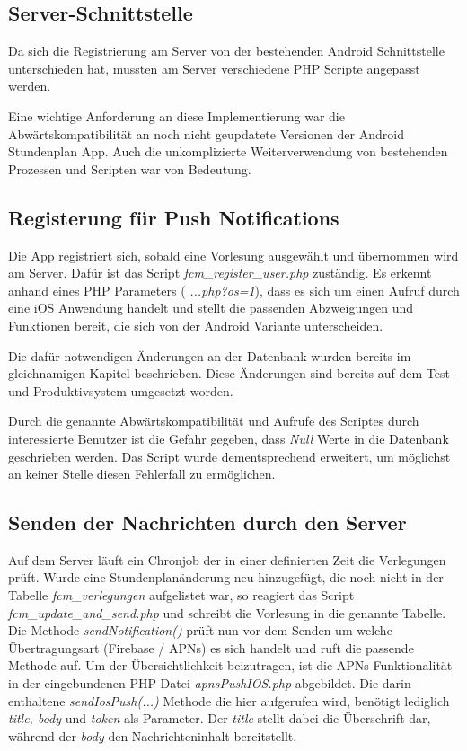 \subsection{Server-Schnittstelle}
Da sich die Registrierung am Server von der bestehenden Android Schnittstelle unterschieden hat, mussten am Server verschiedene PHP Scripte angepasst werden.

Eine wichtige Anforderung an diese Implementierung war die Abwärtskompatibilität an noch nicht geupdatete Versionen der Android Stundenplan App. Auch die unkomplizierte Weiterverwendung von bestehenden Prozessen und Scripten war von Bedeutung.

\newpage


\subsection{Registerung für Push Notifications}
Die App registriert sich, sobald eine Vorlesung ausgewählt und übernommen wird am Server. Dafür ist das Script \textit{fcm\_register\_user.php} zuständig. Es erkennt anhand eines PHP Parameters ( \textit{...php?os=1}), dass es sich um einen Aufruf durch eine iOS Anwendung handelt und stellt die passenden Abzweigungen und Funktionen bereit, die sich von der Android Variante unterscheiden.

Die dafür notwendigen Änderungen an der Datenbank wurden bereits im gleichnamigen Kapitel beschrieben. Diese Änderungen sind bereits auf dem Test- und Produktivsystem umgesetzt worden.

Durch die genannte Abwärtskompatibilität und Aufrufe des Scriptes durch interessierte Benutzer ist die Gefahr gegeben, dass \textit{Null} Werte in die Datenbank geschrieben werden. Das Script wurde dementsprechend erweitert, um möglichst an keiner Stelle diesen Fehlerfall zu ermöglichen.

\subsection{Senden der Nachrichten durch den Server}
Auf dem Server läuft ein Chronjob der in einer definierten Zeit die Verlegungen prüft. Wurde eine Stundenplanänderung neu hinzugefügt, die noch nicht in der Tabelle \textit{fcm\_verlegungen} aufgelistet war, so reagiert das Script \textit{fcm\_update\_and\_send.php} und schreibt die Vorlesung in die genannte Tabelle.\\
Die Methode \textit{sendNotification()} prüft nun vor dem Senden um welche Übertragungsart (Firebase / APNs) es sich handelt und ruft die passende Methode auf.
Um der Übersichtlichkeit beizutragen, ist die APNs Funktionalität in der eingebundenen PHP Datei \textit{apnsPushIOS.php} abgebildet. Die darin enthaltene \textit{sendIosPush(...)} Methode die hier aufgerufen wird, benötigt lediglich \textit{title, body} und \textit{token} als Parameter. Der \textit{title} stellt dabei die Überschrift dar, während der \textit{body} den Nachrichteninhalt bereitstellt.

